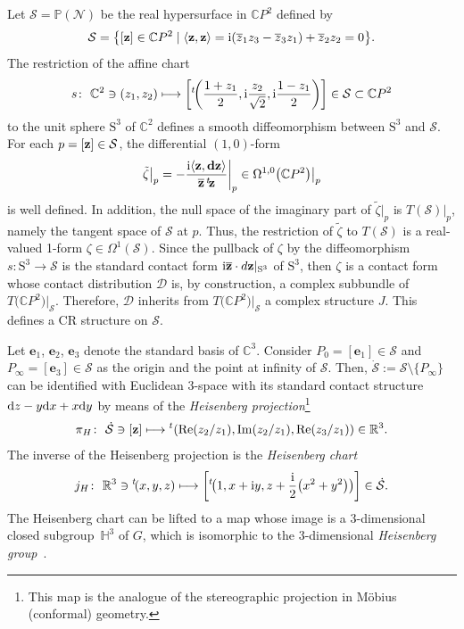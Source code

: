 \documentclass[10pt,a4paper]{amsart}
\numberwithin{equation}{section}
\def\C{\mathbb{C}}
\def\R{\mathbb{R}}
\def\CP{\mathbb{CP}}
\def\H{\mathbb{H}}
\def\S{\mathcal{S}}
\def\CP{\mathbb{C}P}
\def\S{\mathcal{S}}
\begin{document}
%
Let $\mathcal{S}= \mathbb{P}(\mathcal{N})$ be the real hypersurface in $\CP^2$ defined by
%
\begin{equation*}
\mathcal S =\big\{[{\bf z}] \in \CP^2 \mid \langle \mathbf{z},\mathbf{z} \rangle
= {\rm i}(\overline{z}_1z_3-\overline{z}_3z_1)+\overline{z}_2z_2=0\big\}.
 \end{equation*}
The restriction of the affine chart
\begin{equation*}
 s\colon \ \C^2 \ni (z_1,z_2) \longmapsto
 \left[{^t\!\bigg(}\frac{1+z_1}{2},{\rm i}\frac{z_2}{\sqrt{2}},{\rm i}\frac{1-z_1}{2}\bigg)\right]\in \mathcal S\subset \CP^2
 \end{equation*}
to the unit sphere ${\mathrm S}^3$ of $\C^2$ defines a smooth diffeomorphism
between ${\mathrm S}^3$ and $\mathcal{S}$.
For each $p=[{\bf z}]\in \mathcal{S}$, the differential $(1,0)$-form
\begin{equation*}%
 \tilde\zeta\big|_p =
 - \frac{{\rm i} \langle \bf{z},d{\bf z}\rangle}{\overline{{\bf z}} \, {^t\!\bf z}} \bigg|_p \in \Omega^{1,0}\big(\CP^2\big)\big|_p
 \end{equation*}
is well defined. In addition, the null space of the imaginary part of $\tilde\zeta|_p$ is
${{T}(\mathcal{S})}|_p$, namely the tangent space of $\mathcal{S}$ at $p$.
Thus, the restriction of $\tilde\zeta$ to ${{T}(\mathcal{S})}$ is a real-valued 1-form $\zeta\in\Omega^1(\mathcal{S})$.
Since the pullback of $\zeta$ by the diffeomorphism $s\colon \mathrm{S}^3\to\mathcal{S}$ is the standard contact
form ${\rm i}\overline{{\bf z}}\cdot d{{\bf z}}|_{\mathrm{S}^3}$ of $\mathrm{S}^3$, then $\zeta$ is a contact
form whose contact distribution $\mathcal{D}$ is, by construction, a complex subbundle
of ${{T}\big(\CP^2\big)\big|_{\mathcal{S}}}$. Therefore, $\mathcal{D}$ inherits
from ${{T}\big(\CP^2\big)\big|_{\mathcal{S}}}$ a complex structure $J$. This defines a CR structure on $\mathcal{S}$.


Let $\mathbf{e}_1$, $\mathbf{e}_2$, $\mathbf{e}_3$ denote the standard basis of $\mathbb C^3$.
Consider ${P}_{0}=[\mathbf{e}_1]
\in {\mathcal S}$ and ${P}_{\infty}=[\mathbf{e}_3]
\in {\mathcal S}$ as the origin
and the point at infinity of $\S$. Then, $\dot{\S}:= \S\setminus\{P_\infty\}$ can be identified with
Euclidean 3-space with its standard contact structure
${\rm d}z - y{\rm d}x + x{\rm d}y$
by means of the {\em Heisenberg projection}\footnote{This map is the analogue of the stereographic projection in M\"obius (conformal) geometry.}
\[
 \pi_H\colon \ \dot{\S}\ni [{\bf z}]\longmapsto {^t\!\left(\operatorname{Re}(z_2/z_1),\operatorname{Im}(z_2/z_1),\operatorname{Re}(z_3/z_1)\right)}\in \R^3.
\]
The inverse of the Heisenberg projection is the {\em Heisenberg chart}
\[
 j_H \colon \ \R^3 \ni {^t\!(}x, y, z) \longmapsto \bigg[{^t\!\big(}1,x+{\rm i}y,z+\frac{{\rm i}}{2}\big(x^2+y^2\big)\big)\bigg]\in\dot{\S}.
\]
The Heisenberg chart can be lifted to a map
 whose image is a 3-dimensional closed subgroup~$\H^3$ of ${G}$,
 which is isomorphic to the 3-dimensional {\em Heisenberg group}~\cite{MNS-Kharkiv}.
\end{document}
